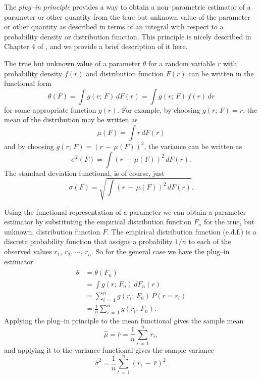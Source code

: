 \documentclass[graybox,envcountchap,sectrefs]{svmono}\usepackage[]{graphicx}\usepackage[]{xcolor}
\begin{document}
\begin{appendices}
The \emph{plug--in} \emph{principle} provides a way to obtain a non--parametric
estimator of a parameter or other quantity from the true but unknown
value of the parameter or other quantity as described in terms of
an integral with respect to a probability density or distribution
function. This principle is nicely described in Chapter 4 of \citet{EfronTibshirani1993},
and we provide a brief description of it here.

The true but unknown value of a parameter $\theta$ for a random variable
$r$ with probability density $f(r)$ and distribution function $F(r)$
can be written in the functional form
\begin{equation}
\theta(F)=\int g(r;\,F)\,dF(r)=\int g(r;\,F)\,f(r)\,dr\label{eq:parameterFunctional}
\end{equation}
for some appropriate function $g(r)$. For example, by choosing $g(r;\,F)=r$,
the mean of the distribution may be written as
\begin{equation}
\mu(F)=\int r\,dF(r)\label{eq:meanFunctional}
\end{equation}
and by choosing $g(r;\,F)=(r\,-\,\mu(F))^{2}$, the variance can be
written as
\begin{equation}
\sigma^{2}(F)=\int(r\,-\,\mu(F))^{2}\,dF(r).\label{eq:varianceFunctional}
\end{equation}
The standard deviation functional, is of course, just
\begin{equation}
\sigma(F)=\sqrt{\int(r\,-\,\mu(F))^{2}\,dF(r)}.\label{eq:stdDevFunctional}
\end{equation}

Using the functional representation of a parameter we can obtain a
parameter estimator by substituting the empirical distribution function
$F_{n}$ for the true, but unknown, distribution function $F$. The
empirical distribution function (e.d.f.) is a discrete probability
function that assigns a probability $1/n$ to each of the observed
values $r_{1},\,r_{2},\,\cdots,\,r_{n}$. So for the general case
we have the plug--in estimator
\begin{align}
\hat{\theta} & =\theta(F_{n})\nonumber \\
 & =\int g(r;\,F_{n})\,dF_{n}(r)\nonumber \\
 & =\sum_{i\,=\,1}^{n}g(r_{i};\,F_{n})\,P(r=r_{i})\nonumber \\
 & =\frac{1}{n}\sum_{i\,=\,1}^{n}g(r_{i};\,F_{n}).\label{eq:pluginEstimator}
\end{align}
Applying the plug--in principle to the mean functional gives the
sample mean
\begin{equation}
\hat{\mu}=\bar{r}=\frac{1}{n}\sum_{i\,=\,1}^{n}r_{i},
\end{equation}
and applying it to the variance functional gives the sample variance
\begin{equation}
\hat{\sigma}^{2}=\frac{1}{n}\sum_{t\,=\,1}^{n}(r_{t}\,-\,\bar{r})^{2}.
\end{equation}



\end{appendices}
\end{document}
